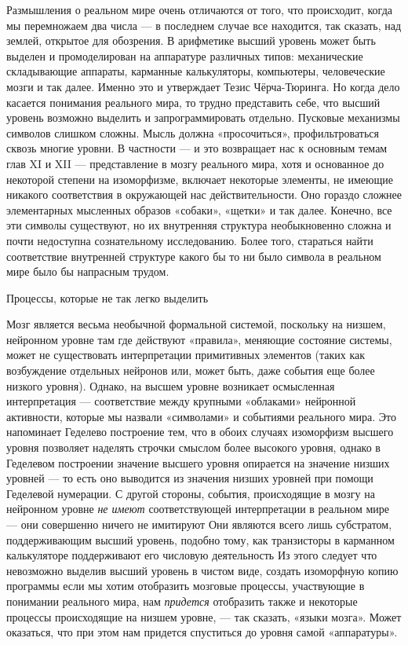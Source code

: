 \documentclass[../main.tex]{subfiles}
\begin{document}
Размышления о реальном мире очень отличаются от того, что происходит, когда мы перемножаем два числа --- в последнем случае все находится, так сказать, над землей, открытое для обозрения. В арифметике высший уровень может быть выделен и промоделирован на аппаратуре различных типов: механические складывающие аппараты, карманные калькуляторы, компьютеры, человеческие мозги и так далее. Именно это и утверждает Тезис Чёрча-Тюринга. Но когда дело касается понимания реального мира, то трудно представить себе, что высший уровень возможно выделить и запрограммировать отдельно. Пусковые механизмы символов слишком сложны. Мысль должна «просочиться», профильтроваться сквозь многие уровни. В частности --- и это возвращает нас к основным темам глав XI и XII --- представление в мозгу реального мира, хотя и основанное до некоторой степени на изоморфизме, включает некоторые элементы, не имеющие никакого соответствия в окружающей нас действительности. Оно гораздо сложнее элементарных мысленных образов «собаки», «щетки» и так далее. Конечно, все эти символы существуют, но их внутренняя структура необыкновенно сложна и почти недоступна сознательному исследованию. Более того, стараться найти соответствие внутренней структуре какого бы то ни было символа в реальном мире было бы напрасным трудом.

Процессы, которые не так легко выделить

Мозг является весьма необычной формальной системой, поскольку на низшем, нейронном уровне там где действуют «правила», меняющие состояние системы, может не существовать интерпретации примитивных элементов (таких как возбуждение отдельных нейронов или, может быть, даже события еще более низкого уровня). Однако, на высшем уровне возникает осмысленная интерпретация --- соответствие между крупными «облаками» нейронной активности, которые мы назвали «символами» и событиями реального мира. Это напоминает Геделево построение тем, что в обоих случаях изоморфизм высшего уровня позволяет наделять строчки смыслом более высокого уровня, однако в Геделевом построении значение высшего уровня опирается на значение низших уровней --- то есть оно выводится из значения низших уровней при помощи Геделевой нумерации. С другой стороны, события, происходящие в мозгу на нейронном уровне \emph{не имеют} соответствующей интерпретации в реальном мире --- они совершенно ничего не имитируют Они являются всего лишь субстратом, поддерживающим высший уровень, подобно тому, как транзисторы в карманном калькуляторе поддерживают его числовую деятельность Из этого следует что невозможно выделив высший уровень в чистом виде, создать изоморфную копию программы если мы хотим отобразить мозговые процессы, участвующие в понимании реального мира, нам \emph{придется} отобразить также и некоторые процессы происходящие на низшем уровне, --- так сказать, «языки мозга». Может оказаться, что при этом нам придется спуститься до уровня самой «аппаратуры».
\end{document}
